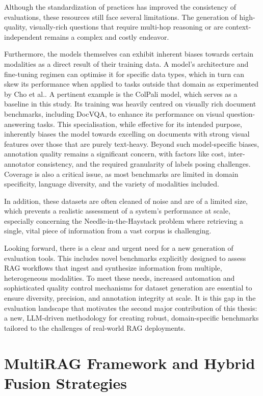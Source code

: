 \documentclass[12pt,twoside]{report}
\begin{document}
Although the standardization of practices has improved the consistency of evaluations, these resources still face several limitations. The generation of high-quality, visually-rich questions that require multi-hop reasoning or are context-independent remains a complex and costly endeavor.

Furthermore, the models themselves can exhibit inherent biases towards certain modalities as a direct result of their training data. A model's architecture and fine-tuning regimen can optimise it for specific data types, which in turn can skew its performance when applied to tasks outside that domain as experimented by Cho et al.\cite{BiasVQA}. A pertinent example is the ColPali model, which serves as a baseline in this study. Its training was heavily centred on visually rich document benchmarks, including DocVQA, to enhance its performance on visual question-answering tasks.\cite{ColPali} This specialisation, while effective for its intended purpose, inherently biases the model towards excelling on documents with strong visual features over those that are purely text-heavy. Beyond such model-specific biases, annotation quality remains a significant concern, with factors like cost, inter-annotator consistency, and the required granularity of labels posing challenges. Coverage is also a critical issue, as most benchmarks are limited in domain specificity, language diversity, and the variety of modalities included.

In addition, these datasets are often cleaned of noise and are of a limited size, which prevents a realistic assessment of a system's performance at scale, especially concerning the Needle-in-the-Haystack problem where retrieving a single, vital piece of information from a vast corpus is challenging.

Looking forward, there is a clear and urgent need for a new generation of evaluation tools. This includes novel benchmarks explicitly designed to assess RAG workflows that ingest and synthesize information from multiple, heterogeneous modalities. To meet these needs, increased automation and sophisticated quality control mechanisms for dataset generation are essential to ensure diversity, precision, and annotation integrity at scale. It is this gap in the evaluation landscape that motivates the second major contribution of this thesis: a new, LLM-driven methodology for creating robust, domain-specific benchmarks tailored to the challenges of real-world RAG deployments.

\chapter{MultiRAG Framework and Hybrid Fusion Strategies} \label{chap:MultiRAGFramework}
\end{document}
